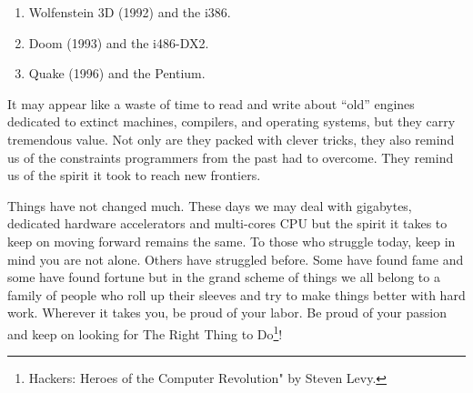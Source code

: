 \documentclass[book.tex]{subfiles}
\begin{document}
\begin{enumerate}
\item Wolfenstein 3D (1992) and the i386.
\item Doom (1993) and the i486-DX2.
\item Quake (1996) and the Pentium.
\end{enumerate}

\bigskip

It may appear like a waste of time to read and write about ``old'' engines dedicated to extinct machines, compilers, and operating systems, but they carry tremendous value. Not only are they packed with clever tricks, they also remind us of the constraints programmers from the past had to overcome. They remind us of the spirit it took to reach new frontiers.\\
\par
Things have not changed much. These days we may deal with gigabytes, dedicated hardware accelerators and multi-cores CPU but the spirit it takes to keep on moving forward remains the same. To those who struggle today, keep in mind you are not alone. Others have struggled before. Some have found fame and some have found fortune but in the grand scheme of things we all belong to a family of people who roll up their sleeves and try to make things better with hard work. Wherever it takes you, be proud of your labor. Be proud of your passion and keep on looking for The Right Thing to Do\footnote{Hackers: Heroes of the Computer Revolution" by Steven Levy.}!\\
\end{document}
